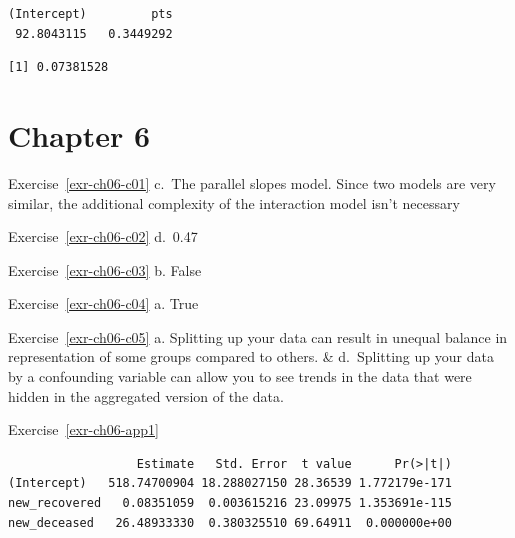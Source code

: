 \documentclass[
  letterpaper,
  DIV=11,
  numbers=noendperiod]{scrreprt}
\newenvironment{Shaded}{\begin{snugshade}}{\end{snugshade}}
\newcommand{\AttributeTok}[1]{\textcolor[rgb]{0.40,0.45,0.13}{#1}}
\newcommand{\CommentTok}[1]{\textcolor[rgb]{0.37,0.37,0.37}{#1}}
\newcommand{\FunctionTok}[1]{\textcolor[rgb]{0.28,0.35,0.67}{#1}}
\newcommand{\NormalTok}[1]{\textcolor[rgb]{0.00,0.23,0.31}{#1}}
\newcommand{\OtherTok}[1]{\textcolor[rgb]{0.00,0.23,0.31}{#1}}
\newcommand{\SpecialCharTok}[1]{\textcolor[rgb]{0.37,0.37,0.37}{#1}}
\theoremstyle{definition}
\theoremstyle{remark}
\begin{document}
\begin{verbatim}
(Intercept)         pts 
 92.8043115   0.3449292 
\end{verbatim}

\begin{Shaded}
\end{Shaded}

\begin{verbatim}
[1] 0.07381528
\end{verbatim}

\hypertarget{sec-ex06-sol}{%
\section{Chapter 6}\label{sec-ex06-sol}}

Exercise~\ref{exr-ch06-c01} c.~The parallel slopes model. Since two
models are very similar, the additional complexity of the interaction
model isn't necessary

Exercise~\ref{exr-ch06-c02} d.~0.47

Exercise~\ref{exr-ch06-c03} b. False

Exercise~\ref{exr-ch06-c04} a. True

Exercise~\ref{exr-ch06-c05} a. Splitting up your data can result in
unequal balance in representation of some groups compared to others. \&
d.~Splitting up your data by a confounding variable can allow you to see
trends in the data that were hidden in the aggregated version of the
data.

Exercise~\ref{exr-ch06-app1}

\begin{Shaded}
\end{Shaded}

\begin{verbatim}
                  Estimate   Std. Error  t value      Pr(>|t|)
(Intercept)   518.74700904 18.288027150 28.36539 1.772179e-171
new_recovered   0.08351059  0.003615216 23.09975 1.353691e-115
new_deceased   26.48933330  0.380325510 69.64911  0.000000e+00
\end{verbatim}
\end{document}
